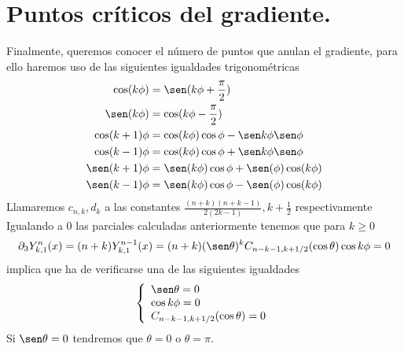 \section{Puntos críticos del gradiente.}
Finalmente, queremos conocer el número de puntos que anulan el gradiente, para ello haremos uso de las siguientes igualdades trigonométricas
\begin{gather*}
\begin{aligned}
\cos(k\phi) &= \sen(k\phi + \frac{\pi}{2}) \\
\sen (k\phi) &= \cos(k\phi - \frac{\pi}{2}) \\
\cos(k+1)\phi &= \cos (k\phi)\cos\phi - \sen k\phi \sen\phi \\
\cos(k-1)\phi &= \cos (k\phi)\cos\phi + \sen k\phi \sen\phi \\
\sen(k+1)\phi &= \sen(k\phi)\cos\phi + \sen(\phi)\cos(k\phi)\\
\sen(k-1)\phi &= \sen(k\phi)\cos\phi - \sen(\phi)\cos(k\phi)\\
\end{aligned}
\end{gather*}
Llamaremos  $c_{n,k},d_k$ a las constantes $\frac{(n+k)(n+k-1)}{2(2k-1)},k+\frac{1}{2}$ respectivamente
Igualando a 0 las parciales calculadas anteriormente tenemos que para $k\ge0$
\begin{gather}
\partial_3 Y_{k,1}^n(x) = (n+k)Y_{k,1}^{n-1}(x) = (n+k)(\sen \theta)^k C_{n-k-1,k+1/2}(\cos \theta) \cos k\phi = 0
\end{gather}
implica que ha de verificarse una de las siguientes igualdades
\begin{gather}
\left\{
\begin{array}{ll}
\sen \theta= 0 \\
\cos k\phi = 0\\
C_{n-k-1,k+1/2}(\cos \theta) = 0
\end{array}
\right.
\end{gather}
Si $\sen \theta = 0$ tendremos que $\theta=0$ o $\theta=\pi$.
\medskip

